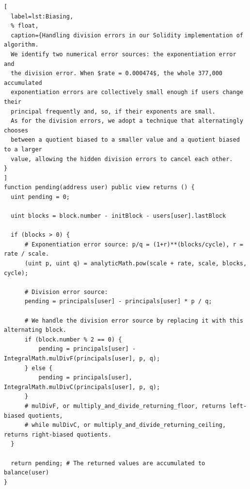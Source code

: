 \documentclass{article}
\begin{document}
\begin{lstlisting}[
  label=lst:Biasing,
  % float,
  caption={Handling division errors in our Solidity implementation of algorithm. 
  We identify two numerical error sources: the exponentiation error and 
  the division error. When $rate = 0.000474$, the whole 377,000 accumulated 
  exponentiation errors are collectively small enough if users change their 
  principal frequently and, so, if their exponents are small.
  As for the division errors, we adopt a technique that alternatingly chooses 
  between a quotient biased to a smaller value and a quotient biased to a larger 
  value, allowing the hidden division errors to cancel each other.
}
]
function pending(address user) public view returns () { 
  uint pending = 0;
  
  uint blocks = block.number - initBlock - users[user].lastBlock
  
  if (blocks > 0) {
      # Exponentiation error source: p/q = (1+r)**(blocks/cycle), r = rate / scale.
      (uint p, uint q) = analyticMath.pow(scale + rate, scale, blocks, cycle);

      # Division error source:
      pending = principals[user] - principals[user] * p / q;

      # We handle the division error source by replacing it with this alternating block.
      if (block.number % 2 == 0) {
          pending = principals[user] - IntegralMath.mulDivF(principals[user], p, q);
      } else {
          pending = principals[user], IntegralMath.mulDivC(principals[user], p, q);
      }
      # mulDivF, or multiply_and_divide_returning_floor, returns left-biased quotients, 
      # while mulDivC, or multiply_and_divide_returning_ceiling, returns right-biased quotients.
  }

  return pending; # The returned values are accumulated to balance(user)
}
\end{lstlisting}
\end{document}
